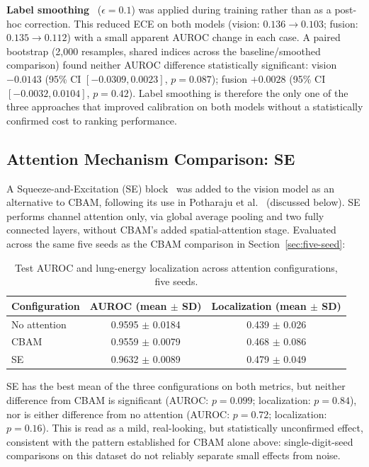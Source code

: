 \textbf{Label smoothing}~\cite{muller2019labelsmoothing} ($\epsilon=0.1$)
was applied during training rather than as a post-hoc correction. This
reduced ECE on both models (vision: $0.136 \rightarrow 0.103$; fusion:
$0.135 \rightarrow 0.112$) with a small apparent AUROC change in each case.
A paired bootstrap (2,000 resamples, shared indices across the
baseline/smoothed comparison) found neither AUROC difference statistically
significant: vision $-0.0143$ (95\% CI $[-0.0309, 0.0023]$, $p=0.087$);
fusion $+0.0028$ (95\% CI $[-0.0032, 0.0104]$, $p=0.42$). Label smoothing is
therefore the only one of the three approaches that improved calibration on
both models without a statistically confirmed cost to ranking performance.

\subsection{Attention Mechanism Comparison: SE}
\label{sec:se}

A Squeeze-and-Excitation (SE) block~\cite{hu2018se} was added to the vision model as an alternative to CBAM, following its use in Potharaju et al.~\cite{potharaju2025enhanced} (discussed below). SE performs channel attention only, via global average pooling and two fully connected layers, without CBAM's added spatial-attention stage. Evaluated across the same five seeds as the CBAM comparison in Section~\ref{sec:five-seed}:

\begin{table}[htbp]
\centering
\caption{Test AUROC and lung-energy localization across attention configurations, five seeds.}
\label{tab:se}
\small
\begin{tabular}{lcc}
\toprule
Configuration & AUROC (mean $\pm$ SD) & Localization (mean $\pm$ SD) \\
\midrule
No attention & 0.9595 $\pm$ 0.0184 & 0.439 $\pm$ 0.026 \\
CBAM & 0.9559 $\pm$ 0.0079 & 0.468 $\pm$ 0.086 \\
SE & 0.9632 $\pm$ 0.0089 & 0.479 $\pm$ 0.049 \\
\bottomrule
\end{tabular}
\end{table}

SE has the best mean of the three configurations on both metrics, but neither difference from CBAM is significant (AUROC: $p=0.099$; localization: $p=0.84$), nor is either difference from no attention (AUROC: $p=0.72$; localization: $p=0.16$). This is read as a mild, real-looking, but statistically unconfirmed effect, consistent with the pattern established for CBAM alone above: single-digit-seed comparisons on this dataset do not reliably separate small effects from noise.

